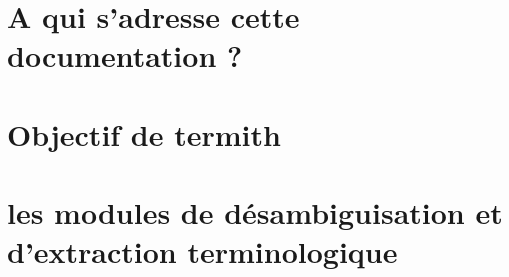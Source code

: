 \section{A qui s'adresse cette documentation ?}
\section{Objectif de termith}
\section{les modules de désambiguisation et d'extraction terminologique}
